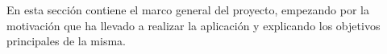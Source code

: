 En esta sección contiene el marco general del proyecto, empezando por la motivación que ha llevado a realizar la aplicación y explicando los objetivos principales de la misma.